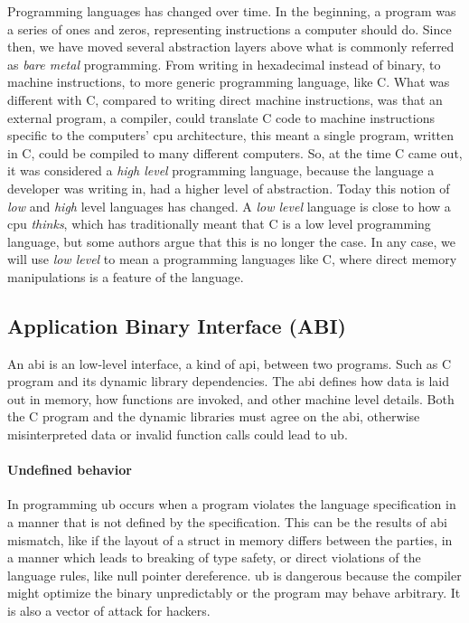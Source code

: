 Programming languages has changed over time. In the beginning, a program was a
series of ones and zeros, representing instructions a computer should do. Since
then, we have moved several abstraction layers above what is commonly referred
as \textit{bare metal} programming. From writing in hexadecimal instead of
binary, to machine instructions, to more generic programming language, like C.
What was different with C, compared to writing direct machine instructions, was
that an external program, a compiler, could translate C code to machine
instructions specific to the computers' \gls{cpu} architecture, this meant a
single program, written in C, could be compiled to many different computers. So,
at the time C came out, it was considered a \textit{high level} programming
language, because the language a developer was writing in, had a higher level of
abstraction. Today this notion of \textit{low} and \textit{high} level languages
has changed. A \textit{low level} language is close to how a \gls{cpu}
\textit{thinks}, which has traditionally meant that C is a low level programming
language, but some authors \cite{cNotLowLevel} argue that this is no longer the
case. In any case, we will use \textit{low level} to mean a programming
languages like C, where direct memory manipulations is a feature of the
language.

\subsection{Application Binary Interface (ABI)}

An \gls{abi} is an low-level interface, a kind of \gls{api},
between two programs. Such as C program and its dynamic library dependencies.
The \gls{abi} defines how data is laid out in memory, how functions are
invoked, and other machine level details. Both the C program and the dynamic
libraries must agree on the \gls{abi}, otherwise misinterpreted data or invalid
function calls could lead to \gls{ub}.

\paragraph{Undefined behavior} In programming \gls{ub} occurs when a program
violates the language specification in a manner that is not defined by the
specification. This can be the results of \gls{abi} mismatch, like if the
layout of a struct in memory differs between the parties, in a manner which
leads to breaking of type safety, or direct violations of the language rules,
like null pointer dereference. \gls{ub} is dangerous because the compiler might
optimize the binary unpredictably or the program may behave arbitrary. It is
also a vector of attack for hackers.

